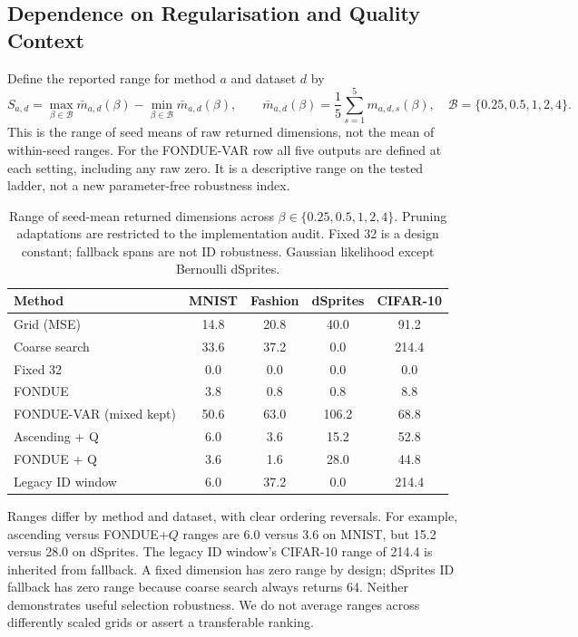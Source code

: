 \documentclass[make,article,submit,pdftex,moreauthors]{Definitions/mdpi}
\begin{document}
\subsection{Dependence on Regularisation and Quality Context}\label{sec:beta}
Define the reported range for method $a$ and dataset $d$ by
\begin{equation}
 S_{a,d}=\max_{\beta\in\mathcal B}\bar m_{a,d}(\beta)
         -\min_{\beta\in\mathcal B}\bar m_{a,d}(\beta),\qquad
 \bar m_{a,d}(\beta)=\frac15\sum_{s=1}^{5}m_{a,d,s}(\beta),
 \quad\mathcal B=\{0.25,0.5,1,2,4\}.
 \label{eq:span}
\end{equation}
This is the range of seed means of raw returned dimensions, not the mean
of within-seed ranges. For the FONDUE-VAR row all five outputs are
defined at each setting, including any raw zero. It is a descriptive
range on the tested ladder, not a new parameter-free robustness index.

\begin{table}[H]
\caption{Range of seed-mean returned dimensions across $\beta\in\{0.25,0.5,1,2,4\}$. Pruning adaptations are restricted to the implementation audit. Fixed 32 is a design constant; fallback spans are not ID robustness. Gaussian likelihood except Bernoulli dSprites.}\label{tab:span}
\small
\setlength{\tabcolsep}{3.5pt}
\begin{tabular*}{\textwidth}{@{\extracolsep{\fill}}lcccc@{}}
\toprule
Method & MNIST & Fashion & dSprites & CIFAR-10 \\
\midrule
Grid (MSE) & 14.8 & 20.8 & 40.0 & 91.2 \\
Coarse search & 33.6 & 37.2 & 0.0 & 214.4 \\
Fixed 32 & 0.0 & 0.0 & 0.0 & 0.0 \\
FONDUE & 3.8 & 0.8 & 0.8 & 8.8 \\
FONDUE-VAR (mixed kept) & 50.6 & 63.0 & 106.2 & 68.8 \\
Ascending + Q & 6.0 & 3.6 & 15.2 & 52.8 \\
FONDUE + Q & 3.6 & 1.6 & 28.0 & 44.8 \\
Legacy ID window & 6.0 & 37.2 & 0.0 & 214.4 \\
\bottomrule
\end{tabular*}
\end{table}


Ranges differ by method and dataset, with clear ordering reversals.
For example, ascending versus FONDUE+$Q$ ranges are 6.0 versus 3.6
on MNIST, but 15.2 versus 28.0 on dSprites. The legacy ID window's
CIFAR-10 range of 214.4 is inherited from fallback. A fixed dimension has zero range by design;
dSprites ID fallback has zero range because coarse search always returns
64. Neither demonstrates useful selection robustness. We do not average
ranges across differently scaled grids or assert a transferable ranking.
\end{document}
